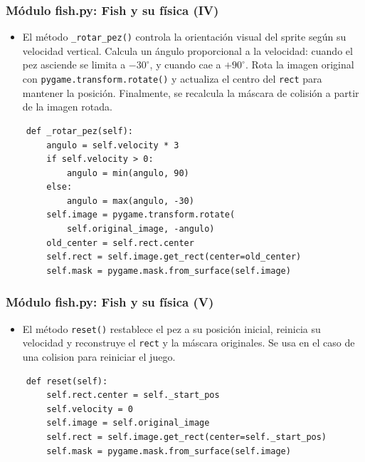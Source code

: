 \documentclass[
	11pt, %
]{beamer}
\begin{document}

\begin{frame}[fragile]
\frametitle{Módulo fish.py: Fish y su física (IV)}

\begin{itemize}
    \item El método \texttt{\_rotar\_pez()} controla la orientación visual del sprite según su velocidad vertical.
    Calcula un ángulo proporcional a la velocidad: cuando el pez asciende se limita a $-30^\circ$, y cuando cae a $+90^\circ$.
    Rota la imagen original con \texttt{pygame.transform.rotate()} y actualiza el centro del \texttt{rect} para mantener la posición.
    Finalmente, se recalcula la máscara de colisión a partir de la imagen rotada.
\end{itemize}

\vspace{4pt}
{\scriptsize
\begin{verbatim}
    def _rotar_pez(self):
        angulo = self.velocity * 3
        if self.velocity > 0:
            angulo = min(angulo, 90)
        else:
            angulo = max(angulo, -30)
        self.image = pygame.transform.rotate(
            self.original_image, -angulo)
        old_center = self.rect.center
        self.rect = self.image.get_rect(center=old_center)
        self.mask = pygame.mask.from_surface(self.image)
\end{verbatim}
}
\end{frame}


\begin{frame}[fragile]
\frametitle{Módulo fish.py: Fish y su física (V)}

\begin{itemize}
    \item El método \texttt{reset()} restablece el pez a su posición inicial, reinicia su velocidad y reconstruye el \texttt{rect} y la máscara originales. Se usa en el caso de una colision para reiniciar el juego.
\end{itemize}

\vspace{4pt}
{\scriptsize
\begin{verbatim}
    def reset(self):
        self.rect.center = self._start_pos
        self.velocity = 0
        self.image = self.original_image
        self.rect = self.image.get_rect(center=self._start_pos)
        self.mask = pygame.mask.from_surface(self.image)
\end{verbatim}
}
\end{frame}
\end{document}
